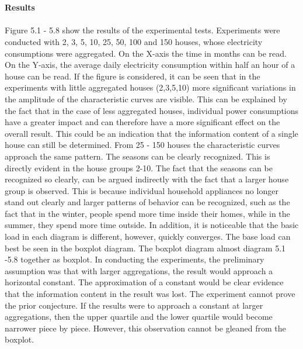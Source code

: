 \\
\\
\textbf{Results}
\\
\\
Figure 5.1 - 5.8 show the results of the experimental tests. Experiments were conducted with 2, 3, 5, 10, 25, 50, 100 and 150 houses, whose electricity consumptions were aggregated. On the X-axis the time in months can be read. On the Y-axis, the average daily electricity consumption within half an hour of a house can be read. If the figure is considered, it can be seen that in the experiments with little aggregated houses (2,3,5,10) more significant variations in the amplitude of the characteristic curves are visible. This can be explained by the fact that in the case of less aggregated houses, individual power consumptions have a greater impact and can therefore have a more significant effect on the overall result. This could be an indication that the information content of a single house can still be determined. From 25 - 150 houses the characteristic curves approach the same pattern. The seasons can be clearly recognized. This is directly evident in the house groups 2-10. The fact that the seasons can be recognized so clearly, can be argued indirectly with the fact that a larger house group is observed. This is because individual household appliances no longer stand out clearly and larger patterns of behavior can be recognized, such as the fact that in the winter, people spend more time inside their homes, while in the summer, they spend more time outside. In addition, it is noticeable that the basic load in each diagram is different, however, quickly converges. The base load can best be seen in the boxplot diagram. The boxplot diagram almost diagram 5.1 -5.8 together as boxplot. In conducting the experiments, the preliminary assumption was that with larger aggregations, the result would approach a horizontal constant. The approximation of a constant would be clear evidence that the information content in the result was lost. The experiment cannot prove the prior conjecture. If the results were to approach a constant at larger aggregations, then the upper quartile and the lower quartile would become narrower piece by piece. However, this observation cannot be gleaned from the boxplot.

